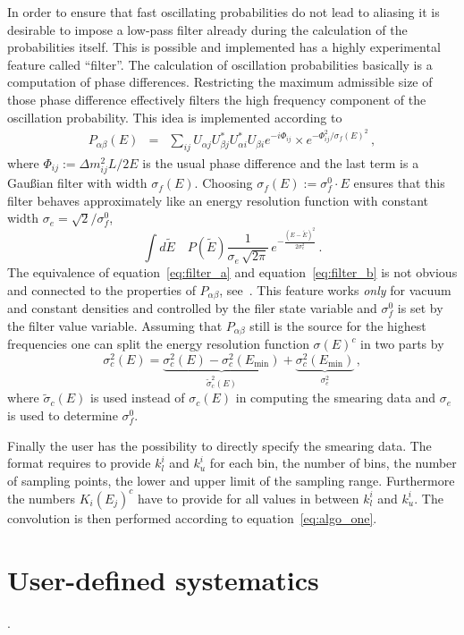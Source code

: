 In order to ensure that fast oscillating probabilities do not lead to aliasing
it is desirable to impose a low-pass filter already during the calculation
of the probabilities itself. This is possible and implemented has a highly
experimental feature called ``filter''. 
The calculation of oscillation
probabilities basically is a computation of phase differences. Restricting
the maximum admissible size of those phase difference effectively filters
the high frequency component of the oscillation probability. This idea is
implemented according to
\begin{eqnarray}
\label{eq:filter_a}
P_{\alpha\beta}(E)&=&\sum_{ij}
U_{\alpha j} U^*_{\beta j} U^*_{\alpha i} U_{\beta i} 
e^{-i\Phi_{ij}}\times 
e^{ -\Phi_{ij}^2/\sigma_f(E)^2 }\,,
\end{eqnarray}
where $\Phi_{ij}:=\Delta m_{ij}^2 L/2E$ is the usual phase difference and
the last term is a Gau\ss ian filter with width $\sigma_f(E)$. Choosing
$\sigma_f(E):=\sigma_f^0 \cdot E$ ensures that this filter behaves 
approximately like an energy resolution function with constant width 
$\sigma_e=\sqrt{2}/\sigma_f^0$, \ie\
\begin{equation}
\label{eq:filter_b}
\int d\tilde E\quad P(\tilde E) \frac{1}{\sigma_e\,\sqrt{2\pi}}\,
e^{-\frac{(E-\tilde E)^2}{2\sigma^2_e}}\,.
\end{equation}
The equivalence of equation~\ref{eq:filter_a} and equation~\ref{eq:filter_b}
is not obvious and connected to the properties of $P_{\alpha\beta}$, 
see~\cite{Kiers:1996zj,Giunti:2003ax}. This feature works \emph{only} 
for vacuum and constant densities and controlled
by the filer state variable and $\sigma_f^0$ is set by the filter value 
variable. Assuming that $P_{\alpha\beta}$ still is the source for the highest
frequencies one can split the energy resolution function $\sigma(E)^c$ in
two parts by
\begin{equation}
\sigma_c^2(E)=\underbrace{\sigma_c^2(E)-\sigma_c^2(E_\mathrm{min})}_
{\tilde\sigma^2_c(E)}+\underbrace{\sigma_c^2(E_\mathrm{min})}_{\sigma_e^2}\,,
\end{equation}
where $\tilde\sigma_c(E)$ is used instead of $\sigma_c(E)$ in computing the
smearing data and $\sigma_e$ is used to determine $\sigma_f^0$.

Finally the user has the possibility to directly specify the smearing data.
The format requires to provide $k_l^i$ and $k_u^i$ for each bin, the number of
bins, the number of sampling points, the lower and upper limit of the sampling
range. Furthermore the numbers $K_i(E_j)^c$ have to provide for all values
in between $k_l^i$ and $k_u^i$. The convolution is then performed according to
equation~\ref{eq:algo_one}.
\section{User-defined systematics}
\label{sec:ud_error_dim}.


